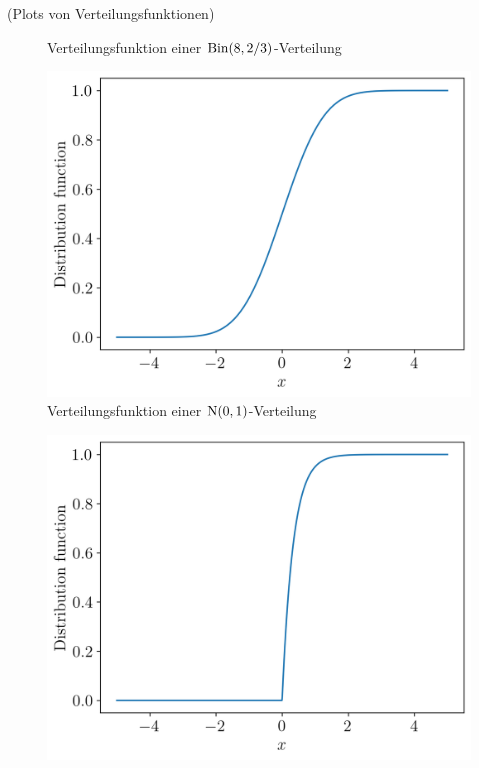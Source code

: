 \begin{Beispiel}{(Plots von Verteilungsfunktionen)}
\begin{minipage}{0.5\linewidth}
\begin{figure}[H]
\begin{center}
\vspace*{-.3\baselineskip}
\caption{\centering Verteilungsfunktion einer $\operatorname{Bin}(8, 2/3)$-Verteilung}
\vspace*{-.3\baselineskip}
\end{center}
\end{figure}
\end{minipage}
\vspace*{-\baselineskip}

\begin{minipage}{0.5\linewidth}
\begin{figure}[H]
\begin{center}
\includegraphics[width=.9\linewidth]{./Section/Grundlegende Begriffe/Verteilungsfunktion Normal.png}
\vspace*{-.3\baselineskip}
\caption{\centering Verteilungsfunktion einer $\operatorname{N}(0, 1)$-Verteilung}
\vspace*{-.3\baselineskip}
\end{center}
\end{figure}
\end{minipage}
\begin{minipage}{0.5\linewidth}
\begin{figure}[H]
\begin{center}
\includegraphics[width=.9\linewidth]{./Section/Grundlegende Begriffe/Verteilungsfunktion Exponential.png}

\end{center}
\end{figure}
\end{minipage}
\end{Beispiel}
